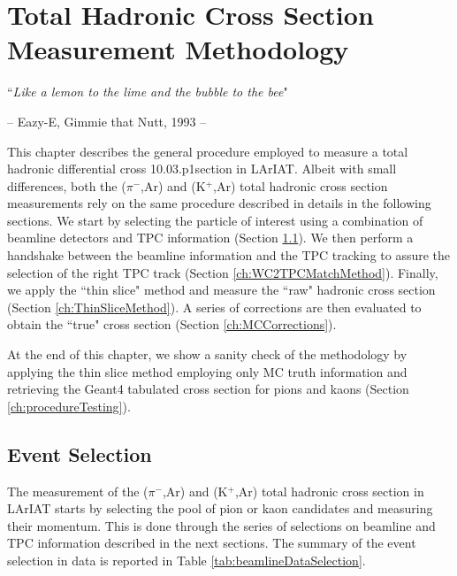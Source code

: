 \chapter{Total Hadronic Cross Section Measurement Methodology}\label{ch:Interactions}
{\raggedleft ``\emph{Like a lemon to the lime and the bubble to the bee}" \par}
{\raggedleft -- Eazy-E, Gimmie that Nutt,  1993 -- \par}
\vspace{0.5cm}

This chapter describes the general procedure employed to measure a total hadronic differential cross 10.03.p1section in LArIAT.
Albeit with small differences, both the  ($\pi^{-}$,Ar) and (K$^{+}$,Ar) total hadronic cross section measurements rely on the same procedure described in details in the following sections. We start by selecting the particle of interest using a combination of beamline detectors and TPC information (Section \ref{ch:ParticleSelectionMethod}). We then perform a handshake between the beamline information and the TPC tracking to assure the selection of the right TPC track (Section \ref{ch:WC2TPCMatchMethod}). Finally, we apply the ``thin slice" method and measure the ``raw" hadronic cross section (Section \ref{ch:ThinSliceMethod}). A series of corrections are then evaluated to obtain the ``true" cross section (Section \ref{ch:MCCorrections}). 

At the end of this chapter, we show a sanity check of the methodology by applying the thin slice method employing only MC truth information and retrieving the Geant4 tabulated cross section for pions and kaons (Section \ref{ch:procedureTesting}).



\section{Event Selection}\label{ch:ParticleSelectionMethod}
The measurement of the ($\pi^{-}$,Ar) and (K$^{+}$,Ar) total hadronic cross section in LArIAT starts by selecting the pool of pion or kaon candidates and measuring their momentum.  This is done through the series of selections on  beamline and TPC information described in the next sections. The summary of the event selection in data is reported in Table \ref{tab:beamlineDataSelection}.


